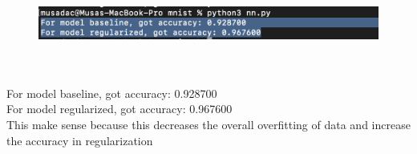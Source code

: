 \begin{answer}
\begin{figure}[h!]
  \centering
  \includegraphics[width=.75\linewidth]{mnist/acc.png}
  \label{fig:sub1}
\end{figure}
\\ \\
For model baseline, got accuracy: 0.928700 \\ 
For model regularized, got accuracy: 0.967600 \\ 
This make sense because this decreases the overall overfitting of data and increase the accuracy in regularization
\\ \\

\end{answer}
